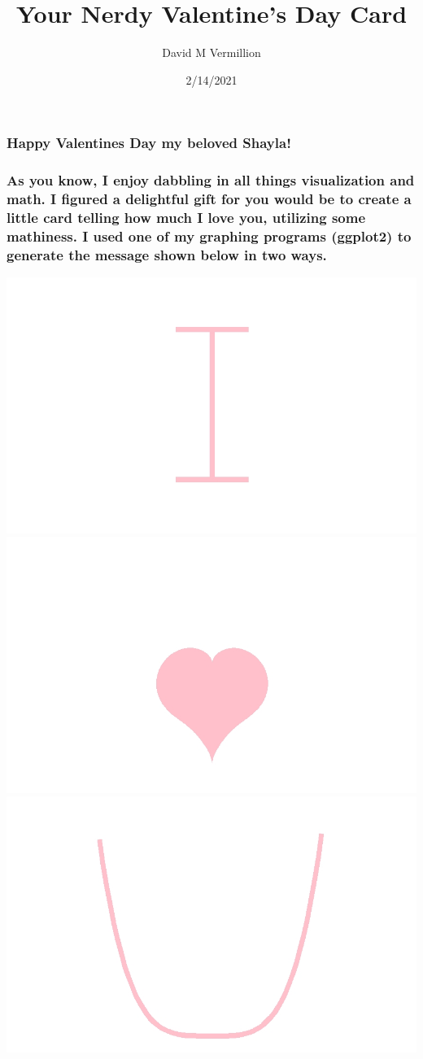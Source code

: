 \documentclass[
  12pt,
]{article}
\title{Your Nerdy Valentine's Day Card}
\author{David M Vermillion}
\date{2/14/2021}
\begin{document}
\maketitle

\hypertarget{happy-valentines-day-my-beloved-shayla}{%
\subsubsection{Happy Valentines Day my beloved
Shayla!}\label{happy-valentines-day-my-beloved-shayla}}

\hypertarget{as-you-know-i-enjoy-dabbling-in-all-things-visualization-and-math.-i-figured-a-delightful-gift-for-you-would-be-to-create-a-little-card-telling-how-much-i-love-you-utilizing-some-mathiness.-i-used-one-of-my-graphing-programs-ggplot2-to-generate-the-message-shown-below-in-two-ways.}{%
\subsubsection{As you know, I enjoy dabbling in all things visualization
and math. I figured a delightful gift for you would be to create a
little card telling how much I love you, utilizing some mathiness. I
used one of my graphing programs (ggplot2) to generate the message shown
below in two
ways.}\label{as-you-know-i-enjoy-dabbling-in-all-things-visualization-and-math.-i-figured-a-delightful-gift-for-you-would-be-to-create-a-little-card-telling-how-much-i-love-you-utilizing-some-mathiness.-i-used-one-of-my-graphing-programs-ggplot2-to-generate-the-message-shown-below-in-two-ways.}}

\hfill\break
\hfill\break
\hfill\break
\hfill\break
\hfill\break
\hfill\break
\hfill\break
\hfill\break

\includegraphics[width=0.3\linewidth]{I}
\includegraphics[width=0.3\linewidth]{Heart2}
\includegraphics[width=0.3\linewidth]{U}
\end{document}
